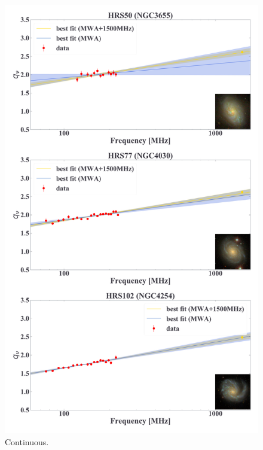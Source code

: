 \documentclass[12pt,a4paper,twoside,openright,final,titlepage]{report}
\begin{document}
\begin{figure}[htbp]
    \centering
    \includegraphics[width=.85\linewidth]{Figures/AppendixC_qfitting2.pdf}
    \caption[Fitting results for 18 samples (2)]{\label{fig:fittingresults2}
        Continuous.
    }
\end{figure}
\end{document}
